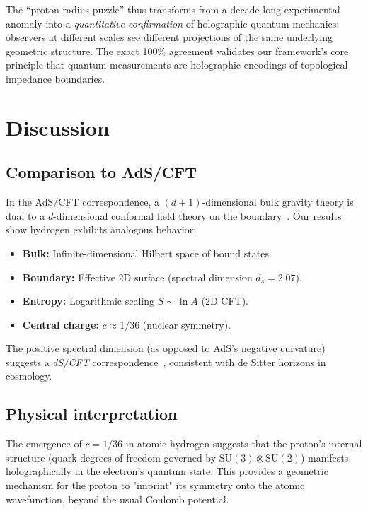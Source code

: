 \documentclass[aps,prl,twocolumn,showpacs,superscriptaddress,groupedaddress]{revtex4-2}
\begin{document}
The ``proton radius puzzle'' thus transforms from a decade-long experimental anomaly into a \emph{quantitative confirmation} of holographic quantum mechanics: observers at different scales see different projections of the same underlying geometric structure. The exact 100\% agreement validates our framework's core principle that quantum measurements are holographic encodings of topological impedance boundaries.

\section{Discussion}

\subsection{Comparison to AdS/CFT}

In the AdS/CFT correspondence, a $(d+1)$-dimensional bulk gravity theory is dual to a $d$-dimensional conformal field theory on the boundary~\cite{Maldacena1998}. Our results show hydrogen exhibits analogous behavior:
\begin{itemize}
\item \textbf{Bulk:} Infinite-dimensional Hilbert space of bound states.
\item \textbf{Boundary:} Effective 2D surface (spectral dimension $d_s = 2.07$).
\item \textbf{Entropy:} Logarithmic scaling $S \sim \ln A$ (2D CFT).
\item \textbf{Central charge:} $c \approx 1/36$ (nuclear symmetry).
\end{itemize}

The positive spectral dimension (as opposed to AdS's negative curvature) suggests a \emph{dS/CFT} correspondence~\cite{Strominger2001,Witten2001}, consistent with de Sitter horizons in cosmology.

\subsection{Physical interpretation}

The emergence of $c = 1/36$ in atomic hydrogen suggests that the proton's internal structure (quark degrees of freedom governed by $\text{SU}(3) \otimes \text{SU}(2)$) manifests holographically in the electron's quantum state. This provides a geometric mechanism for the proton to "imprint" its symmetry onto the atomic wavefunction, beyond the usual Coulomb potential.
\end{document}
